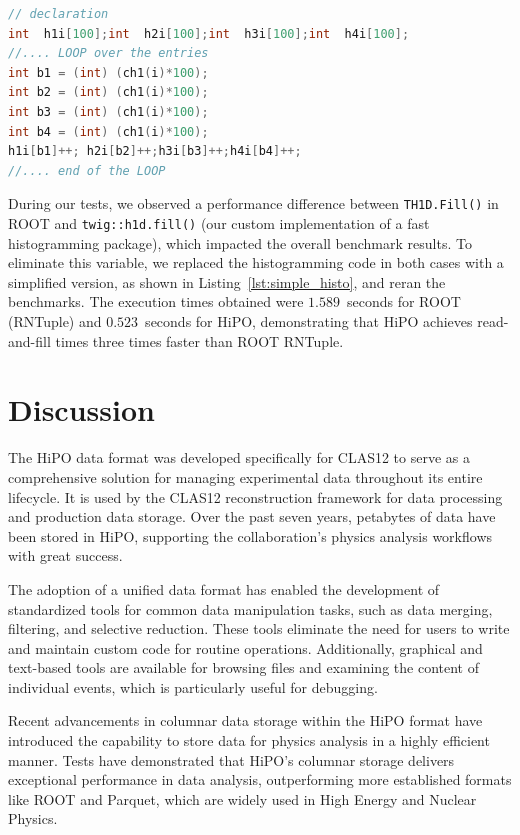 \documentclass[preprint,12pt]{elsarticle}
\begin{document}
\begin{lstlisting}[language=c++, caption=Simplified version for filling histograms to compare data reading speeds more accurately., label=lst:simple_histo]
// declaration
int  h1i[100];int  h2i[100];int  h3i[100];int  h4i[100];
//.... LOOP over the entries
int b1 = (int) (ch1(i)*100);
int b2 = (int) (ch1(i)*100);
int b3 = (int) (ch1(i)*100);
int b4 = (int) (ch1(i)*100);
h1i[b1]++; h2i[b2]++;h3i[b3]++;h4i[b4]++;
//.... end of the LOOP
\end{lstlisting}

During our tests, we observed a performance difference between {\tt TH1D.Fill()} in ROOT and {\tt twig::h1d.fill()} (our custom implementation of a fast histogramming package), which impacted the overall benchmark results. To eliminate this variable, we replaced the histogramming code in both cases with a simplified version, as shown in Listing~\ref{lst:simple_histo}, and reran the benchmarks. The execution times obtained were 
$1.589$~seconds for ROOT (RNTuple) and $0.523$~seconds for HiPO, demonstrating that HiPO achieves read-and-fill times three times faster than ROOT RNTuple.


%
%
%
%
%
%

\section{Discussion}

The HiPO data format was developed specifically for CLAS12 to serve as a comprehensive solution for managing experimental data throughout its entire lifecycle. It is used by the CLAS12 reconstruction framework for data processing and production data storage. Over the past seven years, petabytes of data have been stored in HiPO, supporting the collaboration's physics analysis workflows with great success.

The adoption of a unified data format has enabled the development of standardized tools for common data manipulation tasks, such as data merging, filtering, and selective reduction. These tools eliminate the need for users to write and maintain custom code for routine operations. Additionally, graphical and text-based tools are available for browsing files and examining the content of individual events, which is particularly useful for debugging.

Recent advancements in columnar data storage within the HiPO format have introduced the capability to store data for physics analysis in a highly efficient manner. Tests have demonstrated that HiPO’s columnar storage delivers exceptional performance in data analysis, outperforming more established formats like ROOT and Parquet, which are widely used in High Energy and Nuclear Physics.
\end{document}
